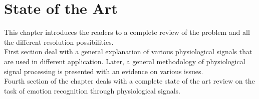 \chapter{State of the Art}
\label{chap:StateOfTheArt}
\pagestyle{plain}
\vspace{0.5cm}

\noindent This chapter introduces the readers to a complete review of the problem and all the different resolution possibilities.
\\
First section deal with a general explanation of various physiological signals that are used in different application. Later, a general methodology of physiological signal processing is presented with an evidence on various issues.
\\
Fourth section of the chapter deals with a complete state of the art review on the task of emotion recognition through physiological signals. 

